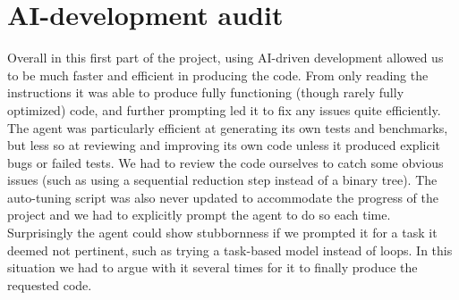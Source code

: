 \documentclass[11pt,a4paper]{article}
\begin{document}
\section{AI-development audit}
Overall in this first part of the project, using AI-driven development allowed us to be much faster and efficient in producing the code. From only reading the instructions it was able to produce fully functioning (though rarely fully optimized) code, and further prompting led it to fix any issues quite efficiently. The agent was particularly efficient at generating its own tests and benchmarks, but less so at reviewing and improving its own code unless it produced explicit bugs or failed tests. We had to review the code ourselves to catch some obvious issues (such as using a sequential reduction step instead of a binary tree). The auto-tuning script was also never updated to accommodate the progress of the project and we had to explicitly prompt the agent to do so each time. Surprisingly the agent could show stubbornness if we prompted it for a task it deemed not pertinent, such as trying a task-based model instead of loops. In this situation we had to argue with it several times for it to finally produce the requested code.
\end{document}
